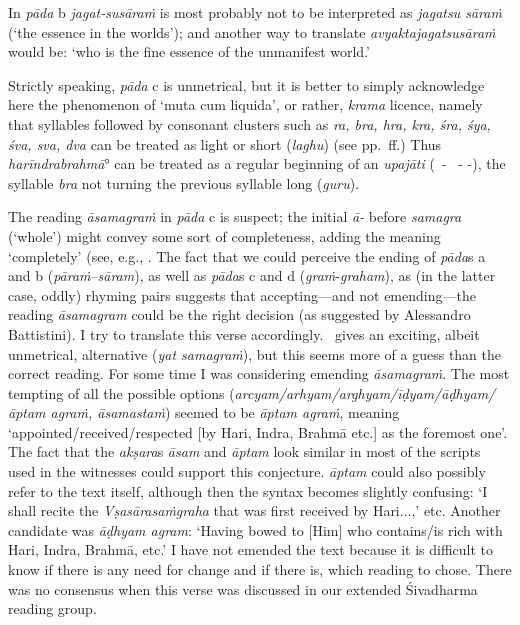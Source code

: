{{ 
  
 
  In \textit{pāda} b \textit{jagat-susāra\.m} is most probably not 
  to be interpreted as \textit{jagatsu sāra\.m} {\rm (}`the essence in the worlds'{\rm )};
  and another way to translate \textit{avyaktajagatsusāra\.m} would be: 
  `who is the fine essence of the unmanifest world.'
 
  
 
  Strictly speaking, \textit{pāda} c is unmetrical, but it is better to 
  simply acknowledge here the phenomenon of `muta cum liquida', or rather,
  \textit{krama} licence, namely
  that syllables followed by consonant clusters such as 
  \textit{ra, bra, hra, kra, śra, śya, śva, sva, dva} can be treated as light or short {\rm (}\textit{laghu}{\rm )}
  {\rm (}see pp.~\pageref{muta}\thinspace ff.{\rm )}
  Thus \textit{harīndrabrahmā}° can be treated as a regular beginning
  of an \textit{upajāti} {\rm (}\shortsyllable\ - \shortsyllable\ - -{\rm )}, the syllable 
  \textit{bra} not turning the previous syllable long {\rm (}\textit{guru}{\rm )}.
 
  
 
  The reading \textit{āsamagra\.m} in \textit{pāda} c is suspect;
  the initial \textit{ā-} before \textit{samagra} {\rm (}`whole'{\rm )} might convey some sort of
  completeness, adding the meaning `completely'
  {\rm (}see, e.g., .
  The fact that we could perceive the ending of \textit{pāda}s a and b 
  {\rm (}\textit{pāra\.m}--\textit{sāram}{\rm )}, as well as \textit{pāda}s c and d {\rm (}\textit{gra\.m}-\textit{graham}{\rm )},
  as {\rm (}in the latter case, oddly{\rm )} rhyming pairs 
  suggests that accepting---and not emending---the reading \textit{āsamagram} could be 
  the right decision {\rm (}as suggested by Alessandro Battistini{\rm )}.
  I try to translate this verse accordingly. \msM\ gives an exciting,
  albeit unmetrical, alternative {\rm (}\textit{yat samagra\.m}{\rm )}, but
  this seems more of a guess than the correct reading.
  For some time I was considering emending \textit{āsamagra\.m}.
  The most tempting of all the possible options 
  {\rm (}\textit{arcyam/arhyam/arghyam/īḍyam/āḍhyam/āptam agra\.m, āsamasta\.m}{\rm )} 
  seemed to be \textit{āptam agra\.m},
  meaning `appointed/received/respected [by Hari, Indra,
  Brahmā etc.] as the foremost one'. The fact that 
  the \textit{akṣara}s \textit{āsam} and \textit{āptam} look similar in most
  of the scripts used in the witnesses could support this
  conjecture. \textit{āptam} could also
  possibly refer to the text itself, although then the
  syntax becomes slightly confusing: `I shall recite the
  \textit{Vṣasārasa\.mgraha} that was first received by Hari...,' etc.
  Another candidate was \textit{āḍhyam agram}:
  `Having bowed to [Him] who contains/is rich with Hari, Indra, Brahmā,
  etc.' I have not emended the text because it is difficult
  to know if there is any need for change and if there is, which reading 
  to chose. There was no consensus when this verse was discussed 
  in our extended Śivadharma reading group.
 
}}
